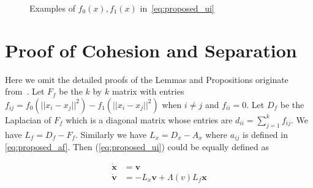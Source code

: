 \begin{figure}[htb]
  \centering
  \caption{Examples of $f_0(x), f_1(x)$ in~\ref{eq:proposed_ui}}\label{fig:f0f1}
\end{figure}

\section{Proof of Cohesion and Separation}

Here we omit the detailed proofs of the Lemmas and Propositions originate from~\cite{CuckerDong2010}. Let $F_f$ be the $k$ by $k$ matrix with entries $f_{ij}=f_0(||x_i-x_j||^2)-f_1(||x_i-x_j||^2)$ when $i\neq j$ and $f_{ii}=0$. Let $D_f$ be the Laplacian of $F_f$ which is a diagonal matrix whose entries are $d_{ii}=\sum_{j=1}^k f_{ij}$. We have $L_f=D_f-F_f$. Similarly we have $L_x=D_x-A_x$ where $a_{ij}$ is defined in \ref{eq:proposed_af}. Then (\ref{eq:proposed_ui}) could be equally defined as

\begin{equation}\label{eq:continuous}
\begin{aligned}
\mathbf{\dot{x}}&=\mathbf{v}\\
\mathbf{\dot{v}}&=-L_x\mathbf{v}+\Lambda(v)L_f\mathbf{x}\\
\end{aligned}
\end{equation}


